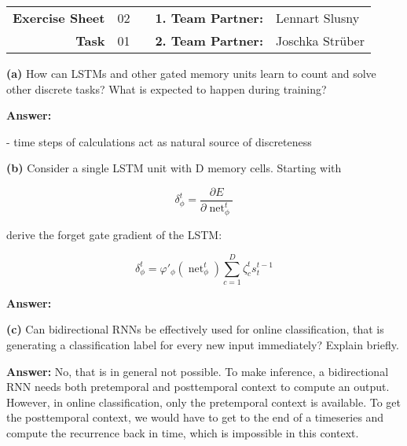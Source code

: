 
\newcommand{\obenlinks}{Recurrent and Generative Artificial Neural Networks}

\begin{center}
	\begin{tabular}{|rlp{4cm}rl|}
	\hline
	 \textbf{Exercise Sheet} & 02  &  & \textbf{1. Team Partner:} & Lennart Slusny  \\
	 \textbf{Task} & 01 & & \textbf{2. Team Partner:} & Joschka Strüber \\ \hline
	\end{tabular}
\end{center} 

\textbf{(a)} How can LSTMs and other gated memory units learn to count and solve other discrete tasks? What is expected to happen during training?

\textbf{Answer:} 

- time steps of calculations act as natural source of discreteness


\textbf{(b)} Consider a single LSTM unit with D memory cells. Starting with 

\begin{equation}
	\delta_\phi^t = \frac{\partial E}{\partial \operatorname{net}_\phi^t}
\end{equation}

derive the forget gate gradient of the LSTM:

\begin{equation}
	\delta_\phi^t = \varphi'_\phi(\operatorname{net}_\phi^t) \sum_{c=1}^{D} \zeta_c^t s_t^{t-1}
\end{equation}

\textbf{Answer:} 

\textbf{(c)} Can bidirectional RNNs be effectively used for online classification, that is generating a classification label for every new input immediately? Explain briefly.

\textbf{Answer:} No, that is in general not possible. To make inference, a bidirectional RNN needs both pretemporal and posttemporal context to compute an output. However, in  online classification, only the pretemporal context is available. To get the posttemporal context, we would have to get to the end of a timeseries and compute the recurrence back in time, which is impossible in this context.


